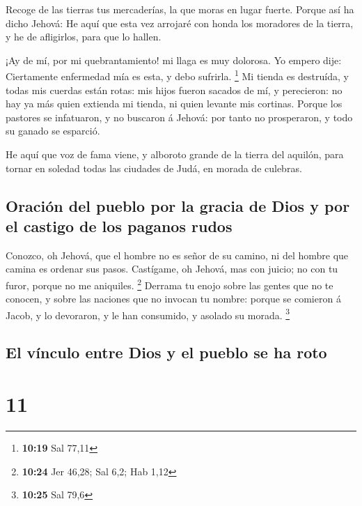  Recoge de las tierras tus mercaderías, la que moras en
lugar fuerte.  Porque así ha dicho Jehová: He aquí que
esta vez arrojaré con honda los moradores de la tierra, y he de
afligirlos, para que lo hallen.

 ¡Ay de mí, por mi quebrantamiento! mi llaga es muy
dolorosa. Yo empero dije: Ciertamente enfermedad mía es esta, y debo
sufrirla. \footnote{\textbf{10:19} Sal 77,11}  Mi tienda
es destruída, y todas mis cuerdas están rotas: mis hijos fueron sacados
de mí, y perecieron: no hay ya más quien extienda mi tienda, ni quien
levante mis cortinas.  Porque los pastores se infatuaron,
y no buscaron á Jehová: por tanto no prosperaron, y todo su ganado se
esparció.

 He aquí que voz de fama viene, y alboroto grande de la
tierra del aquilón, para tornar en soledad todas las ciudades de Judá,
en morada de culebras.

\hypertarget{oraciuxf3n-del-pueblo-por-la-gracia-de-dios-y-por-el-castigo-de-los-paganos-rudos}{%
\subsection{Oración del pueblo por la gracia de Dios y por el castigo de
los paganos
rudos}\label{oraciuxf3n-del-pueblo-por-la-gracia-de-dios-y-por-el-castigo-de-los-paganos-rudos}}

 Conozco, oh Jehová, que el hombre no es señor de su
camino, ni del hombre que camina es ordenar sus pasos. 
Castígame, oh Jehová, mas con juicio; no con tu furor, porque no me
aniquiles. \footnote{\textbf{10:24} Jer 46,28; Sal 6,2; Hab 1,12}
 Derrama tu enojo sobre las gentes que no te conocen, y
sobre las naciones que no invocan tu nombre: porque se comieron á Jacob,
y lo devoraron, y le han consumido, y asolado su morada. \footnote{\textbf{10:25}
  Sal 79,6}

\hypertarget{el-vuxednculo-entre-dios-y-el-pueblo-se-ha-roto}{%
\subsection{El vínculo entre Dios y el pueblo se ha
roto}\label{el-vuxednculo-entre-dios-y-el-pueblo-se-ha-roto}}

\hypertarget{section-10}{%
\section{11}\label{section-10}}

